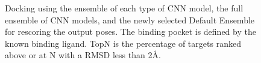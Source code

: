 \documentclass[linenumbers,doublespacing]{bmcart}
\begin{document}
\begin{figure}[tbh]
	\caption{Docking using the ensemble of each type of CNN model, the full ensemble of CNN models, and the newly selected Default Ensemble for rescoring the output poses. The binding pocket is defined by the known binding ligand. TopN is the percentage of targets ranked above or at N with a RMSD less than 2{\AA}.}
	\label{fig:RescoreEnsemble}
\end{figure}    
\end{document}
